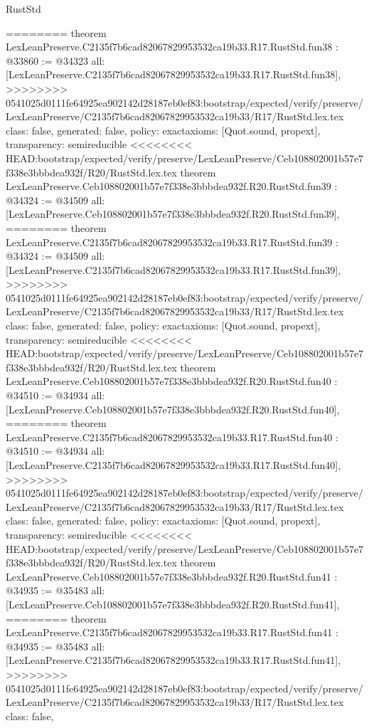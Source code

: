 \begin{lexlean}{RustStd}
\begin{coremodule}
{\begin{coremodule}
{{{{{{{{{{{{{{{{{{{{{{{{{{{{{{{{{{{{{{{{{========
theorem LexLeanPreserve.C2135f7b6cad82067829953532ca19b33.R17.RustStd.fun38 : @33860 := @34323 {
  all: [LexLeanPreserve.C2135f7b6cad82067829953532ca19b33.R17.RustStd.fun38],
>>>>>>>> 0541025d0111fe64925ea902142d28187eb0ef83:bootstrap/expected/verify/preserve/LexLeanPreserve/C2135f7b6cad82067829953532ca19b33/R17/RustStd.lex.tex
  class: false,
  generated: false,
  policy: exact{axioms: [Quot.sound, propext]},
  transparency: semireducible
}
<<<<<<<< HEAD:bootstrap/expected/verify/preserve/LexLeanPreserve/Ceb108802001b57e7f338e3bbbdea932f/R20/RustStd.lex.tex
theorem LexLeanPreserve.Ceb108802001b57e7f338e3bbbdea932f.R20.RustStd.fun39 : @34324 := @34509 {
  all: [LexLeanPreserve.Ceb108802001b57e7f338e3bbbdea932f.R20.RustStd.fun39],
========
theorem LexLeanPreserve.C2135f7b6cad82067829953532ca19b33.R17.RustStd.fun39 : @34324 := @34509 {
  all: [LexLeanPreserve.C2135f7b6cad82067829953532ca19b33.R17.RustStd.fun39],
>>>>>>>> 0541025d0111fe64925ea902142d28187eb0ef83:bootstrap/expected/verify/preserve/LexLeanPreserve/C2135f7b6cad82067829953532ca19b33/R17/RustStd.lex.tex
  class: false,
  generated: false,
  policy: exact{axioms: [Quot.sound, propext]},
  transparency: semireducible
}
<<<<<<<< HEAD:bootstrap/expected/verify/preserve/LexLeanPreserve/Ceb108802001b57e7f338e3bbbdea932f/R20/RustStd.lex.tex
theorem LexLeanPreserve.Ceb108802001b57e7f338e3bbbdea932f.R20.RustStd.fun40 : @34510 := @34934 {
  all: [LexLeanPreserve.Ceb108802001b57e7f338e3bbbdea932f.R20.RustStd.fun40],
========
theorem LexLeanPreserve.C2135f7b6cad82067829953532ca19b33.R17.RustStd.fun40 : @34510 := @34934 {
  all: [LexLeanPreserve.C2135f7b6cad82067829953532ca19b33.R17.RustStd.fun40],
>>>>>>>> 0541025d0111fe64925ea902142d28187eb0ef83:bootstrap/expected/verify/preserve/LexLeanPreserve/C2135f7b6cad82067829953532ca19b33/R17/RustStd.lex.tex
  class: false,
  generated: false,
  policy: exact{axioms: [Quot.sound, propext]},
  transparency: semireducible
}
<<<<<<<< HEAD:bootstrap/expected/verify/preserve/LexLeanPreserve/Ceb108802001b57e7f338e3bbbdea932f/R20/RustStd.lex.tex
theorem LexLeanPreserve.Ceb108802001b57e7f338e3bbbdea932f.R20.RustStd.fun41 : @34935 := @35483 {
  all: [LexLeanPreserve.Ceb108802001b57e7f338e3bbbdea932f.R20.RustStd.fun41],
========
theorem LexLeanPreserve.C2135f7b6cad82067829953532ca19b33.R17.RustStd.fun41 : @34935 := @35483 {
  all: [LexLeanPreserve.C2135f7b6cad82067829953532ca19b33.R17.RustStd.fun41],
>>>>>>>> 0541025d0111fe64925ea902142d28187eb0ef83:bootstrap/expected/verify/preserve/LexLeanPreserve/C2135f7b6cad82067829953532ca19b33/R17/RustStd.lex.tex
  class: false,
}}}}}}}}}}}}}}}}}}}}}}}}}}}}}}}}}}}}}}}}}}}}}
\end{coremodule}}
\end{coremodule}
\end{lexlean}
